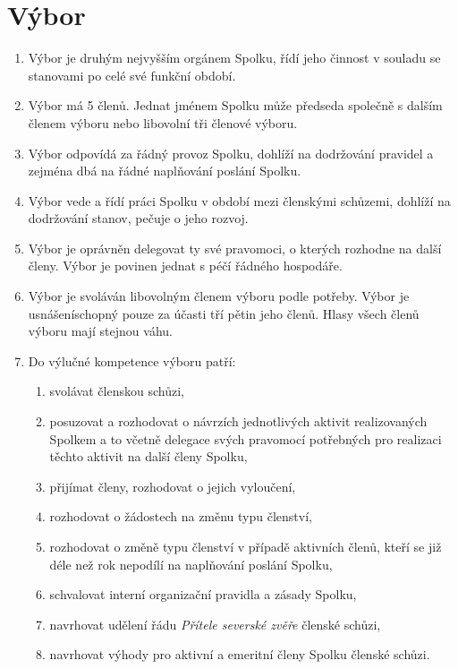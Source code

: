 \documentclass[11pt,a4paper]{article}
\begin{document}
\section{Výbor}
\begin{enumerate}[itemsep=0pt]
    \item Výbor je druhým nejvyšším orgánem Spolku, řídí jeho činnost v souladu 
    se stanovami po celé své funkční období. 
    \item Výbor má 5 členů. Jednat jménem Spolku může 
    předseda společně s dalším členem výboru nebo libovolní tři členové výboru.
    \item Výbor odpovídá za řádný provoz Spolku, dohlíží na dodržování pravidel 
    a zejména dbá na řádné naplňování poslání Spolku.
    \item Výbor vede a řídí práci Spolku v období mezi členskými schůzemi, 
    dohlíží na dodržování stanov, pečuje o jeho rozvoj.
    \item Výbor je oprávněn delegovat ty své pravomoci, o kterých rozhodne na 
    další členy. Výbor je povinen jednat s péčí řádného hospodáře. 
    \item Výbor je svoláván libovolným členem výboru podle potřeby. Výbor je 
    usnášeníschopný pouze za účasti tří pětin jeho členů. Hlasy všech členů 
    výboru mají stejnou váhu.
    \item Do výlučné kompetence výboru patří: 
    \begin{enumerate}[itemsep=0pt,topsep=0pt]
        \item svolávat členskou schůzi, 
        \item posuzovat a rozhodovat o návrzích jednotlivých aktivit 
        realizovaných Spolkem a to včetně delegace svých pravomocí potřebných 
        pro realizaci těchto aktivit na další členy Spolku,
        \item přijímat členy, rozhodovat o jejich 
        vyloučení,
	\item rozhodovat o žádostech na změnu typu členství,
	\item rozhodovat o změně typu členství v případě aktivních členů, kteří se již déle než rok nepodílí na naplňování poslání Spolku,
        \item schvalovat interní organizační pravidla a zásady Spolku,
        \item navrhovat udělení řádu \textit{Přítele severské zvěře} členské schůzi,
        \item navrhovat výhody pro aktivní a emeritní členy Spolku členské schůzi.
    \end{enumerate}
\end{enumerate}
\end{document}
